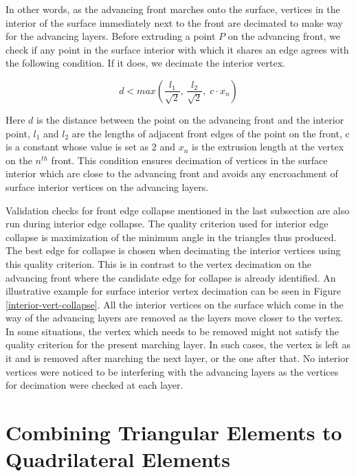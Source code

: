 In other words, as the advancing front marches onto the surface, vertices in the interior of the surface immediately next to the front are decimated to make way for the advancing layers. Before extruding a point $P$ on the advancing front, we check if any point in the surface interior with which it shares an edge agrees with the following condition. If it does, we decimate the interior vertex.

\begin{equation}
    d < max \left( \frac{l_{1}}{\sqrt{2}}, \, \frac{l_{2}}{\sqrt{2}}, \; c \cdot  \mathit{x_n}\right)
    \label{collapse-eq}
\end{equation}

Here $d$ is the distance between the point on the advancing front and the interior point, $l_1$ and $l_2$ are the lengths of adjacent front edges of the point on the front, c is a constant whose value is set as $2$ and $x_n$ is the extrusion length at the vertex on the $n^{th}$ front. This condition ensures decimation of vertices in the surface interior which are close to the advancing front and avoids any encroachment of surface interior vertices on the advancing layers. 

Validation checks for front edge collapse mentioned in the last subsection are also run during interior edge collapse. The quality criterion used for interior edge collapse is maximization of the minimum angle in the triangles thus produced. The best edge for collapse is chosen when decimating the interior vertices using this quality criterion. This is in contrast to the vertex decimation on the advancing front where the candidate edge for collapse is already identified. An illustrative example for surface interior vertex decimation can be seen in Figure \ref{interior-vert-collapse}. All the interior vertices on the surface which come in the way of the advancing layers are removed as the layers move closer to the vertex. In some situations, the vertex which needs to be removed might not satisfy the quality criterion for the present marching layer. In such cases, the vertex is left as it and is removed after marching the next layer, or the one after that. No interior vertices were noticed to be interfering with the advancing layers as the vertices for decimation were checked at each layer.

\section{Combining Triangular Elements to Quadrilateral Elements}

